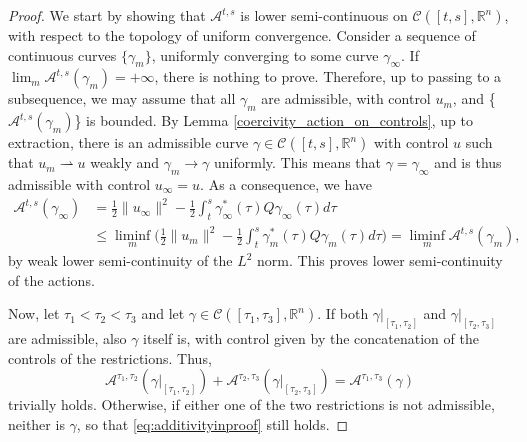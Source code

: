 \documentclass[reqno]{amsart}
\theoremstyle{plain}
\theoremstyle{definition}
\theoremstyle{remark}
\begin{document}
	\begin{proof}
		We start by showing that $\mathcal{A}^{t,s}$ is lower semi-continuous on $\mathcal{C}([t,s],\mathbb{R}^n)$, with respect to the topology of uniform convergence.
		Consider a sequence of continuous curves $\{\gamma_m\}$, uniformly converging to some curve $\gamma_{\infty}$. If $\lim_{m}\mathcal{A}^{t,s}(\gamma_m)=+\infty$, there is nothing to prove. Therefore, up to passing to a subsequence, we may assume that all $\gamma_m$ are admissible, with control $u_m$, and
 \{$\mathcal{A}^{t,s}(\gamma_m)$\} is bounded. By Lemma \ref{coercivity_action_on_controls}, up to extraction, there is an admissible curve $\gamma\in \mathcal{C}([t,s],\mathbb{R}^n)$ with control $u$ such that $u_m\rightharpoonup  u$ weakly and $\gamma_m \to \gamma$ uniformly. This means that $\gamma = \gamma_\infty$ and is thus admissible with control $u_\infty=u$.
As a consequence, we have
		\begin{align}
			\mathcal{A}^{t,s}(\gamma_{\infty})&=\frac{1}{2}\|u_\infty\|^2-\frac{1}{2}\int_{t}^{s}\gamma_{\infty}^*(\tau)Q\gamma_{\infty}(\tau)d\tau\\
			&\leq\liminf_{m}\bigg(\frac{1}{2}\|u_m\|^2-\frac{1}{2}\int_{t}^{s}\gamma_m^*(\tau)Q\gamma_m(\tau)d\tau\bigg)=\liminf_{m}\mathcal{A}^{t,s}(\gamma_m),
		\end{align}
        by weak lower semi-continuity of the $L^2$ norm. This proves lower semi-continuity of the actions.

		Now, let $\tau_1<\tau_2<\tau_3$ and let $\gamma\in\mathcal{C}([\tau_1,\tau_3],\mathbb{R}^n)$. If both $\gamma|_{[\tau_1,\tau_2]}$ and $\gamma|_{[\tau_2,\tau_3]}$ are admissible, also $\gamma$ itself is, with control given by the concatenation of the controls of the restrictions. Thus,
		\begin{equation}\label{eq:additivityinproof}
			\mathcal{A}^{\tau_1,\tau_2}(\gamma|_{[\tau_1,\tau_2]}) + \mathcal{A}^{\tau_2,\tau_3}(\gamma|_{[\tau_2,\tau_3]}) = \mathcal{A}^{\tau_1,\tau_3}(\gamma)
		\end{equation}
		trivially holds. Otherwise, if either one of the two restrictions is not admissible, neither is $\gamma$, so that \eqref{eq:additivityinproof} still holds.
        

\end{proof}
\end{document}

